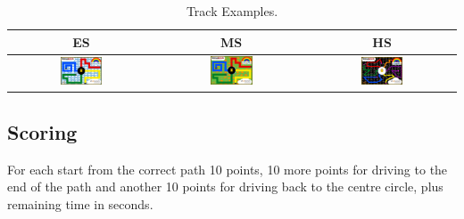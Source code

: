 \documentclass[a4paper,12pt]{article}
\begin{document}
\begin{center}
\begin{table}[H]
	\begin{tabular}{|c|c|c|} \hline
		ES & MS & HS \\
		\hline
\includegraphics[width=0.3\textwidth]{images/cyberspace/rainbow_es.png}
&
\includegraphics[width=0.3\textwidth]{images/cyberspace/rainbow_ms.png}
&
\includegraphics[width=0.3\textwidth]{images/cyberspace/rainbow_hs.png}
\\
    		\hline
	\end{tabular}
\caption{\label{tab:table-name}Track Examples.}
\end{table}
\end{center}

\subsection{Scoring}

For each start from the correct path 10 points, 10 more points for driving to
the end of the path and another 10 points for driving back to the centre
circle, plus remaining time in seconds.
\end{document}
